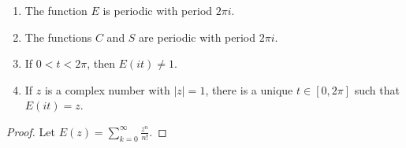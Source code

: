 \begin{theorem}
	\begin{enumerate}
		\item The function $E$ is periodic with period $2\pi i$.
		\item The functions $C$ and $S$ are periodic with period $2\pi i$.
		\item If $0 < t < 2\pi$, then $E(it) \ne 1$.
		\item If $z$ is a complex number with $|z| =1$, there is a unique $t \in [0,2\pi]$ such that $E(it) = z$.
	\end{enumerate}
\end{theorem}
\begin{proof}
	Let $\displaystyle E(z) = \sum_{k=0}^\infty \frac{z^n}{n!}$.
\end{proof}

